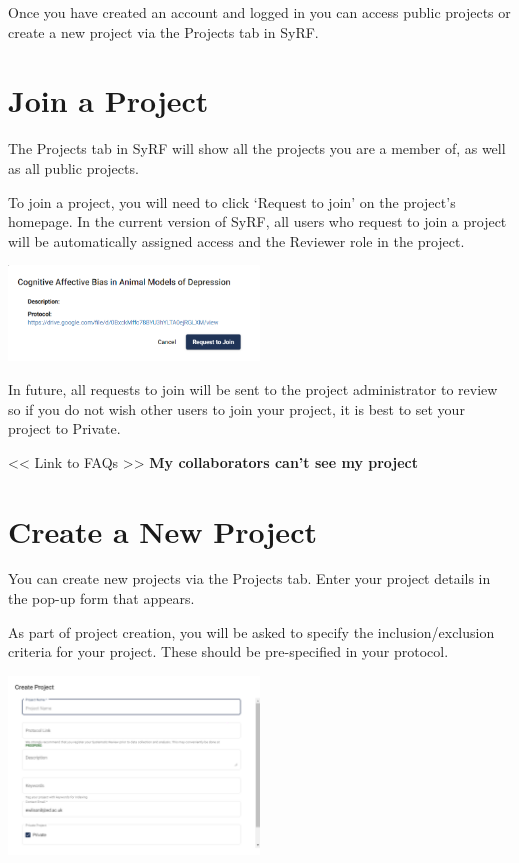 \documentclass[
]{book}
\begin{document}
Once you have created an account and logged in you can access public projects or create a new project via the Projects tab in SyRF.

\hypertarget{join}{%
\chapter{Join a Project}\label{join}}

The Projects tab in SyRF will show all the projects you are a member of, as well as all public projects.

To join a project, you will need to click `Request to join' on the project's homepage. In the current version of SyRF, all users who request to join a project will be automatically assigned access and the Reviewer role in the project.

\includegraphics[width=0.5\textwidth,height=0.5\textheight]{figs/03_01_request_to_join.png}

In future, all requests to join will be sent to the project administrator to review so if you do not wish other users to join your project, it is best to set your project to Private.

\textless{}\textless{} Link to FAQs \textgreater{}\textgreater{}
\textbf{My collaborators can't see my project}

\hypertarget{createProject}{%
\chapter{Create a New Project}\label{createProject}}

You can create new projects via the Projects tab. Enter your project details in the pop-up form that appears.

As part of project creation, you will be asked to specify the inclusion/exclusion criteria for your project. These should be pre-specified in your protocol.

\includegraphics[width=0.5\textwidth,height=0.5\textheight]{figs/04_01_create_a_project.png}
\end{document}
